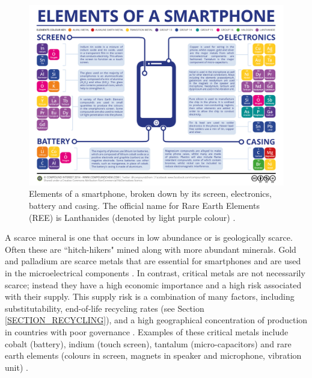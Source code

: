 \documentclass{article}
\begin{document}
\begin{figure}[h]
    \includegraphics[width=.95 \textwidth]{./images/elements_of_smartphone.png}
    \centering
    \caption{Elements of a smartphone, broken down by its screen, electronics, battery and casing. The official name for Rare Earth Elements (REE) is Lanthanides (denoted by light purple colour) \cite{compoundinterest2014}.}
    \label{ELements_Of_Smartphone}
\end{figure}

A scarce mineral is one that occurs in low abundance or is geologically scarce. Often these are ``hitch-hikers" mined along with more abundant minerals. Gold and palladium are scarce metals that are essential for smartphones and are used in the microelectrical components \cite{compoundinterest2014, geologicalsociety2018}. In contrast, critical metals are not necessarily scarce; instead they have a high economic importance and a high risk associated with their supply. This supply risk is a combination of many factors, including substitutability, end-of-life recycling rates (see Section \ref{SECTION_RECYCLING}), and a high geographical concentration of production in countries with poor governance \cite{eu2014criticalmaterials}. Examples of these critical metals include cobalt (battery), indium (touch screen), tantalum (micro-capacitors) and rare earth elements (colours in screen, magnets in speaker and microphone, vibration unit) \cite{peiro2013material, compoundinterest2014}.
\end{document}
